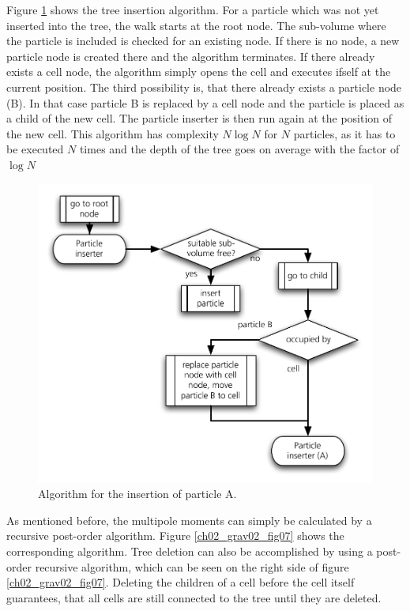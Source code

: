 Figure \ref{ch02_grav02_fig06} shows the tree insertion algorithm. For a particle which was not yet  inserted into the tree, the walk starts at the root node. The sub-volume where the particle is included is checked for an existing node. If there is no node, a new particle node is created there and the algorithm terminates. If there already exists a cell node, the algorithm simply opens the cell and executes ifself at the current position. The third possibility is, that there already exists a particle node (B). In that case particle B is replaced by a cell node and the particle is placed as a child of the new cell. The particle inserter is then run again at the position of the new cell. This algorithm has complexity $N \log{N}$ for $N$ particles, as it has to be executed $N$ times and the depth of the tree goes on average with the factor of $\log{N}$
\begin{figure}[htbp]
\begin{center}
\includegraphics[scale=0.6]{13algo_particle_insert.pdf}
\caption{Algorithm for the insertion of particle A.}
\label{ch02_grav02_fig06}
\end{center}
\end{figure}

As mentioned before, the multipole moments can simply be calculated by a recursive post-order algorithm. Figure \ref{ch02_grav02_fig07} shows the corresponding algorithm. Tree deletion can also be accomplished by using a post-order recursive algorithm, which can be seen on the right side of figure \ref{ch02_grav02_fig07}. Deleting the children of a cell before the cell itself guarantees, that all cells are still connected to the tree until they are deleted.


